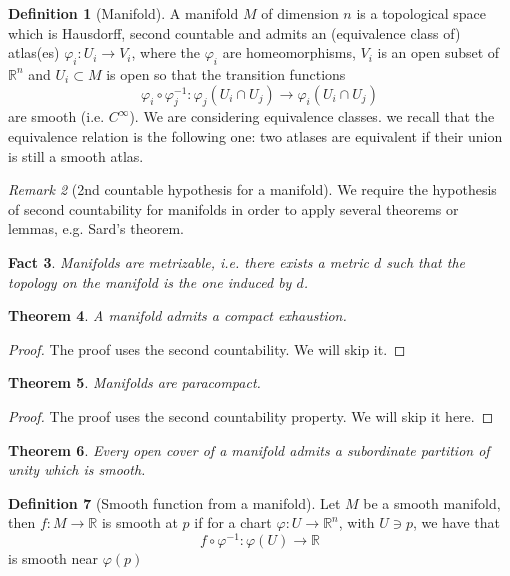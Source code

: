 \documentclass[a4paper,11pt,titlepage, article, oneside]{memoir}
\numberwithin{equation}{section}
\newtheorem{theorem}{Theorem}[section]
\newtheorem{fact}[theorem]{Fact}
\theoremstyle{definition}
\newtheorem{definition}[theorem]{Definition}
\theoremstyle{remark}
\newtheorem{remark}[theorem]{Remark}
\newcommand{\rfield}{\mathbb{R}}
\begin{document}
\begin{definition}[Manifold]
A manifold $M$ of dimension $n$ is a topological space which is Hausdorff, second countable and admits an (equivalence class of) atlas(es) $\varphi_i \colon U_i \rightarrow V_i$, where the 
$\varphi_i$ are homeomorphisms, $V_i$ is an open subset of $\rfield^n$ and $U_i \subset M$ is open so that the transition functions
$$\varphi_i \circ \varphi_j^{-1} \colon \varphi_j(U_i \cap U_j) \rightarrow \varphi_i (U_i \cap U_j)$$ are smooth (i.e. $C^{\infty}$). We are considering equivalence classes. we recall that the equivalence relation is the following one: two atlases are equivalent if their union is still a smooth atlas.
\end{definition}

\begin{remarkbox} \begin{remark}[2nd countable hypothesis for a manifold]
We require the hypothesis of second countability for manifolds in order to apply several theorems or lemmas, e.g. Sard's theorem.
\end{remark} \end{remarkbox}

\begin{fact}
Manifolds are metrizable, i.e. there exists a metric $d$ such that the topology on the manifold is the one induced by $d$.
\end{fact}


\begin{theorem}
A manifold admits a compact exhaustion.
\end{theorem}
\begin{proof}
The proof uses the second countability. We will skip it.
\end{proof}


\begin{theorem} \label{paracompactnessthm}
Manifolds are paracompact.
\end{theorem}
\begin{proof}
The proof uses the second countability property. We will skip it here.
\end{proof}



\begin{theorem}
Every open cover of a manifold admits a subordinate partition of unity which is smooth.
\end{theorem}



\begin{definition}[Smooth function from a manifold]
Let $M$ be a smooth manifold, then $f \colon M \rightarrow \rfield $ is smooth at $p$ if for a chart $\varphi \colon U \rightarrow \rfield^n$, with $U \ni p$, we have that
$$f \circ \varphi^{-1} \colon \varphi(U) \rightarrow \rfield$$
is smooth near $\varphi(p)$
\end{definition}
\end{document}
